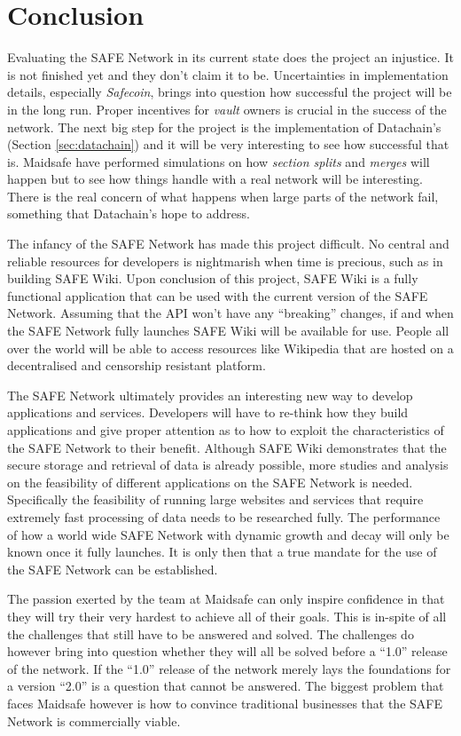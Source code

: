 \chapter{Conclusion}

Evaluating the SAFE Network in its current state does the project an injustice. It is not finished yet and they don't claim it to be. Uncertainties in implementation details, especially \textit{Safecoin}, brings into question how successful the project will be in the long run. Proper incentives for \textit{vault} owners is crucial in the success of the network. The next big step for the project is the implementation of Datachain's (Section \ref{sec:datachain}) and it will be very interesting to see how successful that is. Maidsafe have performed simulations on how \textit{section splits} and \textit{merges} will happen but to see how things handle with a real network will be interesting. There is the real concern of what happens when large parts of the network fail, something that Datachain's hope to address.

The infancy of the SAFE Network has made this project difficult. No central and reliable resources for developers is nightmarish when time is precious, such as in building SAFE Wiki. Upon conclusion of this project, SAFE Wiki is a fully functional application that can be used with the current version of the SAFE Network. Assuming that the API won't have any ``breaking'' changes, if and when the SAFE Network fully launches SAFE Wiki will be available for use. People all over the world will be able to access resources like Wikipedia that are hosted on a decentralised and censorship resistant platform.

The SAFE Network ultimately provides an interesting new way to develop applications and services. Developers will have to re-think how they build applications and give proper attention as to how to exploit the characteristics of the SAFE Network to their benefit. Although SAFE Wiki demonstrates that the secure storage and retrieval of data is already possible, more studies and analysis on the feasibility of different applications on the  SAFE Network is needed. Specifically the feasibility of running large websites and services that require extremely fast processing of data needs to be researched fully. The performance of how a world wide SAFE Network with dynamic growth and decay will only be known once it fully launches. It is only then that a true mandate for the use of the SAFE Network can be established. 

The passion exerted by the team at Maidsafe can only inspire confidence in that they will try their very hardest to achieve all of their goals. This is in-spite of all the challenges that still have to be answered and solved. The challenges do however bring into question whether they will all be solved before a ``1.0'' release of the network. If the ``1.0'' release of the network merely lays the foundations for a version ``2.0'' is a question that cannot be answered. The biggest problem that faces Maidsafe however is how to convince traditional businesses that the SAFE Network is commercially viable.

